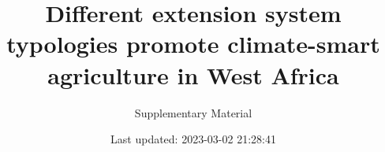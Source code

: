 \documentclass[
]{article}
\title{Different extension system typologies promote climate-smart agriculture in West Africa}
\subtitle{Supplementary Material}
\date{Last updated: 2023-03-02 21:28:41}
\begin{document}
\maketitle

\newpage

\newpage
\listoftables
\newpage

\begin{table}[]
\caption{Descriptive plot: Distribution of extension systems by year}
\label{tab:my-table2}
\end{table}

\clearpage
\end{document}
